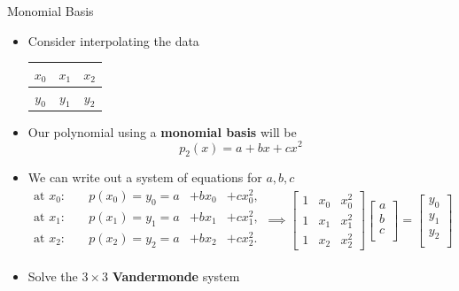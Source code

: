 \documentclass[10pt]{beamer}
\begin{document}
\begin{frame}{Monomial Basis}
\begin{itemize}
\item Consider interpolating the data
\begin{center}
  \begin{tabular}{c | c | c}
  $x_0$ & $x_1$ & $x_2$\\\hline
  $y_0$ & $y_1$ & $y_2$\\
  \end{tabular}
\end{center}
\item Our polynomial using a \textbf{monomial basis} will be   
\begin{equation*}
  p_2(x) = a + bx + cx^2
\end{equation*}

\item We can write out a system of equations for $a,b,c$
\[
\begin{alignedat}{4}
  \text{at }x_0:\quad 
    &p(x_0)=y_0= a &+ bx_0 &+ c x_0^2,\\
  \text{at }x_1:\quad 
    &p(x_1)=y_1 =a &+ bx_1 &+ c x_1^2, \\
  \text{at }x_2:\quad 
    &p(x_2)=y_2 =a &+ bx_2 &+ c x_2^2. \\
\end{alignedat}\implies
    \begin{bmatrix}
      1 & x_0 & x_0^2 \\
      1 & x_1 & x_1^2 \\
      1 & x_2 & x_2^2 
    \end{bmatrix}
    \begin{bmatrix}
      a\\
      b\\
      c\\
    \end{bmatrix}
     =
    \begin{bmatrix}
      y_0\\
      y_1\\
      y_2\\
    \end{bmatrix}
\]
\item Solve the $3\times3$ \textbf{Vandermonde} system
\end{itemize}
\end{frame}
\end{document}
